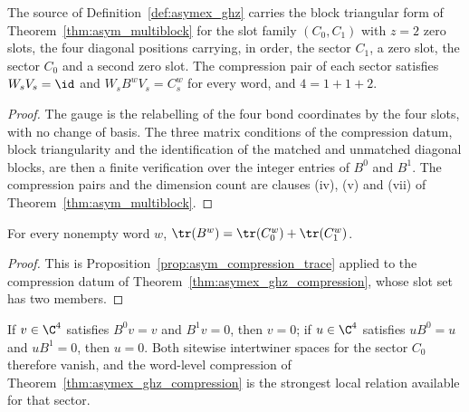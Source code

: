 \begin{theorem}
    \label{thm:asymex_ghz_compression}
    \leanok
    The source of Definition~\ref{def:asymex_ghz} carries the block
    triangular form of Theorem~\ref{thm:asym_multiblock} for the slot family
    $(C_0,C_1)$ with $z=2$ zero slots, the four diagonal positions carrying,
    in order, the sector $C_1$, a zero slot, the sector $C_0$ and a second
    zero slot. The compression pair of each sector satisfies $W_sV_s=\id$
    and $W_sB^wV_s=C_s^w$ for every word, and $4=1+1+2$.
\end{theorem}

\begin{proof}
    \leanok
    The gauge is the relabelling of the four bond coordinates by the four
    slots, with no change of basis. The three matrix conditions of the
    compression datum, block triangularity and the identification of the
    matched and unmatched diagonal blocks, are then a finite verification
    over the integer entries of $B^0$ and $B^1$. The compression pairs and
    the dimension count are clauses (iv), (v) and (vii) of
    Theorem~\ref{thm:asym_multiblock}.
\end{proof}

\begin{theorem}
    \label{thm:asymex_ghz_trace}
    \leanok
    For every nonempty word $w$, $\tr(B^w)=\tr(C_0^w)+\tr(C_1^w)$.
\end{theorem}

\begin{proof}
    \leanok
    This is Proposition~\ref{prop:asym_compression_trace} applied to the
    compression datum of Theorem~\ref{thm:asymex_ghz_compression}, whose
    slot set has two members.
\end{proof}

\begin{theorem}
    \label{thm:asymex_ghz_no_intertwiner}
    \leanok
    If $v\in\C^4$ satisfies $B^0v=v$ and $B^1v=0$, then $v=0$; if
    $u\in\C^4$ satisfies $uB^0=u$ and $uB^1=0$, then $u=0$. Both sitewise
    intertwiner spaces for the sector $C_0$ therefore vanish, and the
    word-level compression of Theorem~\ref{thm:asymex_ghz_compression} is
    the strongest local relation available for that sector.
\end{theorem}

